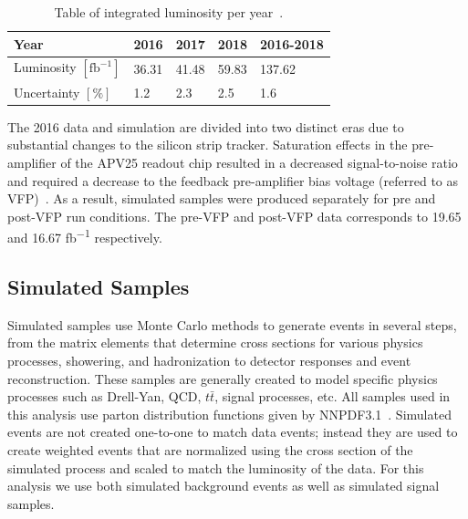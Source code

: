 \begin{table}[h]
	\centering
	\caption[Table of integrated luminosity per year~\cite{cmslumi2016,cmslumi2017,cmslumi2018}.]{Table of integrated luminosity per year~\cite{cmslumi2016,cmslumi2017,cmslumi2018}.}
	\label{tab:intLumi}
	\begin{tabular}{l|l|l|l|l}\hline
		Year & 2016 & 2017 & 2018 & 2016-2018\\
		\hline
		\hline
		Luminosity $[\text{fb}^{-1}]$ & 36.31 & 41.48 & 59.83 & 137.62\\
		\hline	
		Uncertainty $[\%]$ & 1.2 & 2.3 & 2.5 & 1.6\\
		\hline
	\end{tabular}
\end{table}

The 2016 data and simulation are divided into two distinct eras due to substantial changes to the silicon strip tracker. Saturation effects in the pre-amplifier of the APV25 readout chip resulted in a decreased signal-to-noise ratio and required a decrease to the feedback pre-amplifier bias voltage (referred to as VFP)~\cite{CMS-DP-2020-045}. As a result, simulated samples were produced separately for pre and post-VFP run conditions. The pre-VFP and post-VFP data corresponds to 19.65 and 16.67 \unit{fb^{-1}} respectively.

\subsection{Simulated Samples} \label{sec:ana_mc}
Simulated samples use Monte Carlo methods to generate events in several steps, from the matrix elements that determine cross sections for various physics processes, showering, and hadronization to detector responses and event reconstruction. These samples are generally created to model specific physics processes such as Drell-Yan, QCD, $t\bar{t}$, signal processes, etc. All samples used in this analysis use parton distribution functions given by NNPDF3.1~\cite{nnpdf3p1}. Simulated events are not created one-to-one to match data events; instead they are used to create weighted events that are normalized using the cross section of the simulated process and scaled to match the luminosity of the data. For this analysis we use both simulated background events as well as simulated signal samples.


